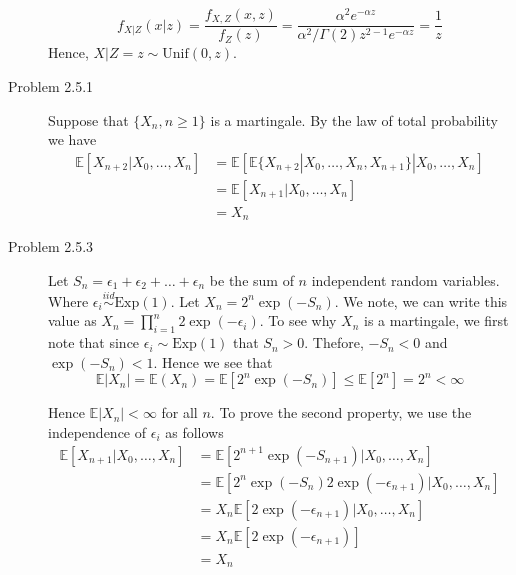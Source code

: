 \documentclass[12pt]{article}  %
\newcommand{\e}{{\epsilon}}
\newcommand{\E}{{\mathbb{E}}}
\begin{document}
\begin{description}
$$f_{X|Z}(x|z) = \frac{f_{X,Z}(x,z)}{f_Z(z)} = \frac{\alpha^2e^{-\alpha z}}{\alpha^2/\Gamma(2)z^{2 - 1}e^{-\alpha z}} = \frac{1}{z}$$
Hence, $X|Z=z\sim\text{Unif}(0,z)$. 


\item[Problem 2.5.1] Suppose that $\{X_n, n\geq 1\}$ is a martingale. By the law of total probability we have 
\begin{align*}
\E[X_{n+2}|X_0, \ldots, X_n] &= \E[\E\{X_{n+2}|X_0, \ldots, X_n, X_{n+1}\}|X_0, \ldots, X_n]\\
&= \E[X_{n+1}|X_0, \ldots, X_{n}]\\
&= X_{n}
\end{align*}

\item[Problem 2.5.3] Let $S_n = \e_1 + \e_2+\ldots + \e_n$ be the sum of $n$ independent random variables. Where $\e_i\overset{iid}{\sim}\text{Exp}(1)$. Let $X_n = 2^n\exp(-S_n)$. We note, we can write this value as $X_n = \prod_{i=1}^{n}2\exp(-\e_i)$. To see why $X_n$ is a martingale, we first note that since $\e_i\sim\text{Exp}(1)$ that $S_n>0$. Thefore, $-S_n<0$ and $\exp(-S_n)<1$. Hence we see that $$\E|X_n| = \E(X_n) = \E[2^n\exp(-S_n)]\leq \E[2^n] = 2^n<\infty$$

Hence $\E|X_n|<\infty$ for all $n$. To prove the second property, we use the independence of $\e_i$ as follows
\begin{align*}
\E[X_{n+1}|X_0, \ldots, X_n] &= \E[2^{n+1}\exp(-S_{n+1})|X_0, \ldots, X_n]\\
&= \E[2^n\exp(-S_n)2\exp(-\e_{n+1})|X_0, \ldots, X_n]\\
&= X_n\E[2\exp(-\e_{n+1})|X_0, \ldots, X_n]\\
&= X_n\E[2\exp(-\e_{n+1})]\\
&= X_n
\end{align*}





\end{description}	
\end{document}
